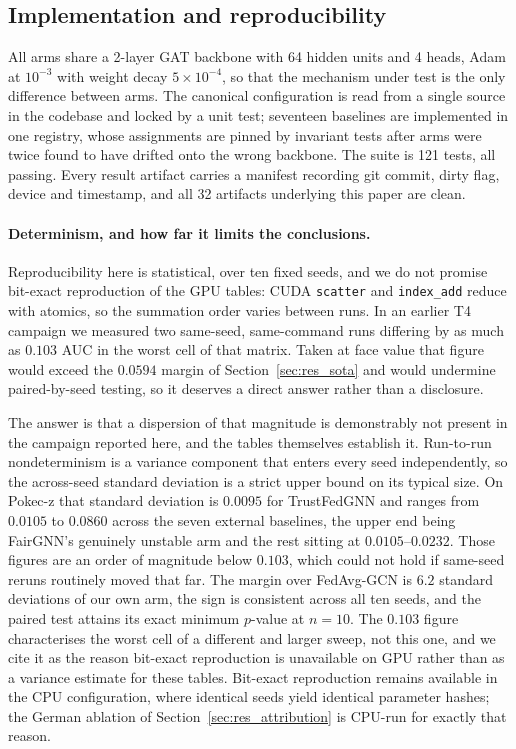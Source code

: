 \documentclass[preprint,12pt]{elsarticle}
\theoremstyle{plain}
\theoremstyle{definition}
\theoremstyle{remark}
\begin{document}
\subsection{Implementation and reproducibility}
\label{sec:implementation}
All arms share a 2-layer GAT backbone with 64 hidden units and 4 heads, Adam at $10^{-3}$ with weight decay $5\times10^{-4}$, so that the mechanism under test is the only difference between arms. The canonical configuration is read from a single source in the codebase and locked by a unit test; seventeen baselines are implemented in one registry, whose assignments are pinned by invariant tests after arms were twice found to have drifted onto the wrong backbone. The suite is 121 tests, all passing. Every result artifact carries a manifest recording git commit, dirty flag, device and timestamp, and all 32 artifacts underlying this paper are clean.

\paragraph{Determinism, and how far it limits the conclusions.}
Reproducibility here is statistical, over ten fixed seeds, and we do not promise bit-exact reproduction of the GPU tables: CUDA \texttt{scatter} and \texttt{index\_add} reduce with atomics, so the summation order varies between runs. In an earlier T4 campaign we measured two same-seed, same-command runs differing by as much as $0.103$ AUC in the worst cell of that matrix. Taken at face value that figure would exceed the $0.0594$ margin of Section~\ref{sec:res_sota} and would undermine paired-by-seed testing, so it deserves a direct answer rather than a disclosure.

The answer is that a dispersion of that magnitude is demonstrably not present in the campaign reported here, and the tables themselves establish it. Run-to-run nondeterminism is a variance component that enters every seed independently, so the across-seed standard deviation is a strict upper bound on its typical size. On Pokec-z that standard deviation is $0.0095$ for TrustFedGNN and ranges from $0.0105$ to $0.0860$ across the seven external baselines, the upper end being FairGNN's genuinely unstable arm and the rest sitting at $0.0105$--$0.0232$. Those figures are an order of magnitude below $0.103$, which could not hold if same-seed reruns routinely moved that far. The margin over FedAvg-GCN is $6.2$ standard deviations of our own arm, the sign is consistent across all ten seeds, and the paired test attains its exact minimum $p$-value at $n=10$. The $0.103$ figure characterises the worst cell of a different and larger sweep, not this one, and we cite it as the reason bit-exact reproduction is unavailable on GPU rather than as a variance estimate for these tables. Bit-exact reproduction remains available in the CPU configuration, where identical seeds yield identical parameter hashes; the German ablation of Section~\ref{sec:res_attribution} is CPU-run for exactly that reason.
\end{document}
